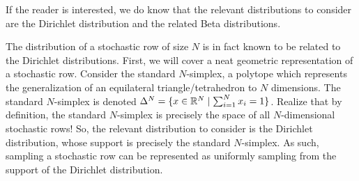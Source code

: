 If the reader is interested, we do know that the relevant distributions to consider are the Dirichlet distribution and the related Beta distributions.

\begin{remark}
The distribution of a stochastic row of size $N$ is in fact known to be related to the Dirichlet distributions.
First, we will cover a neat geometric representation of a stochastic row.
Consider the standard $N$-simplex, a polytope which represents the generalization of an equilateral triangle/tetrahedron to $N$ dimensions.
The standard $N$-simplex is denoted $\Delta^N = \{x \in \mathbb{R}^N \mid \sum_{i = 1}^N x_i = 1\}$.
Realize that by definition, the standard $N$-simplex is precisely the space of all $N$-dimensional stochastic rows!
So, the relevant distribution to consider is the Dirichlet distribution, whose support is precisely the standard $N$-simplex. As such, sampling a stochastic row can be represented as uniformly sampling from the support of the Dirichlet distribution.
\end{remark}

%
%

